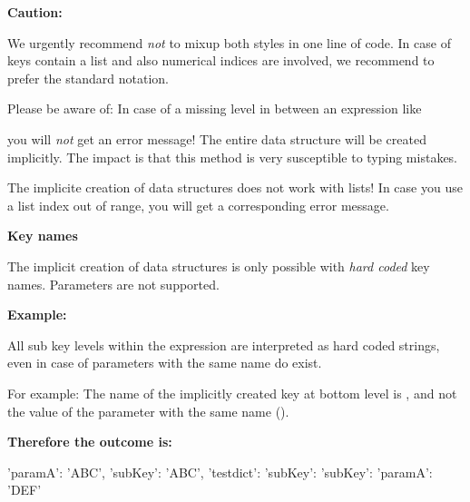 \vspace{2ex}

\textbf{Caution:}

We urgently recommend \textit{not} to mixup both styles in one line of code. In case of keys contain a list and also numerical indices are involved,
we recommend to prefer the standard notation. 

Please be aware of: In case of a missing level in between an expression like 


you will \textit{not} get an error message! The entire data structure will be created implicitly. The impact is that this method
is very susceptible to typing mistakes.

The implicite creation of data structures does not work with lists! In case you use a list index out of range, you will get
a corresponding error message.


\newpage

\textbf{Key names}

The implicit creation of data structures is only possible with \textit{hard coded} key names. Parameters are not supported.

\vspace{2ex}

\textbf{Example:}


All sub key levels within the expression  are interpreted as hard coded strings, even in case of parameters with the same name do exist.

For example: The name of the implicitly created key at bottom level is , and not the value  of the parameter with the same name ().

\vspace{2ex}

\textbf{Therefore the outcome is:}

\begin{pythonlog}
{'paramA': 'ABC', 'subKey': 'ABC', 'testdict': {'subKey': {'subKey': {'paramA': 'DEF'}}}}
\end{pythonlog}

